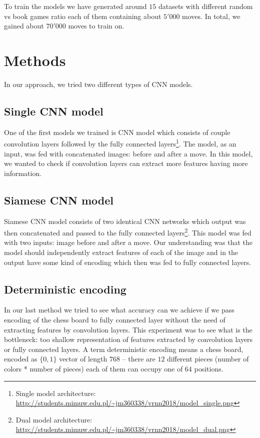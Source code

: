\documentclass[10pt,twocolumn,letterpaper]{article}
\begin{document}
To train the models we have generated around $15$ datasets with different random
vs book games ratio each of them containing about $5'000$ moves. In total, we
gained about $70'000$ moves to train on.

\section{Methods}

In our approach, we tried two different types of CNN models.

\subsection{Single CNN model}

One of the first models we trained is CNN model which consists of couple
convolution layers followed by the fully connected layers\footnote{Single model
architecture:
\url{http://students.mimuw.edu.pl/~jm360338/vrnn2018/model_single.png}}. The
model, as an input, was fed with concatenated images: before and after a move.
In this model, we wanted to check if convolution layers can extract more
features having more information.

\subsection{Siamese CNN model}

Siamese CNN model consists of two identical CNN networks which output was then
concatenated and passed to the fully connected layers\footnote{Dual model
architecture:
\url{http://students.mimuw.edu.pl/~jm360338/vrnn2018/model_dual.png}}. This
model was fed with two inputs: image before and after a move. Our understanding
was that the model should independently extract features of each of the image
and in the output have some kind of encoding which then was fed to fully
connected layers.

\subsection{Deterministic encoding}

In our last method we tried to see what accuracy can we achieve if we pass
encoding of the chess board to fully connected layer without the need of
extracting features by convolution layers. This experiment was to see what is
the bottleneck: too shallow representation of features extracted by convolution
layers or fully connected layers. A term deterministic encoding means a chess
board, encoded as $\{0,1\}$ vector of length $768$ -- there are $12$ different
pieces (number of colors * number of pieces) each of them can occupy one of $64$
positions.
\end{document}
